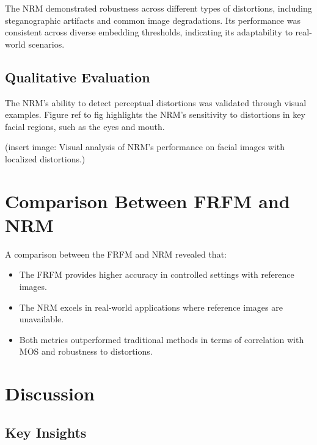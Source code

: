 The NRM demonstrated robustness across different types of distortions, including steganographic artifacts and common image degradations. Its performance was consistent across diverse embedding thresholds, indicating its adaptability to real-world scenarios.

\subsection{Qualitative Evaluation}

The NRM's ability to detect perceptual distortions was validated through visual examples. Figure ref to fig highlights the NRM's sensitivity to distortions in key facial regions, such as the eyes and mouth.


(insert image: Visual analysis of NRM's performance on facial images with localized distortions.)

\section{Comparison Between FRFM and NRM}

A comparison between the FRFM and NRM revealed that:
\begin{itemize}
    \item The FRFM provides higher accuracy in controlled settings with reference images.
    \item The NRM excels in real-world applications where reference images are unavailable.
    \item Both metrics outperformed traditional methods in terms of correlation with MOS and robustness to distortions.
\end{itemize}

\section{Discussion}

\subsection{Key Insights}

